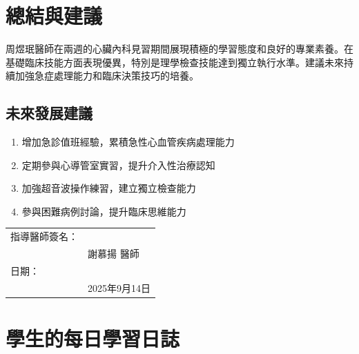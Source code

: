 \documentclass[12pt,a4paper]{article}
\begin{document}
\section{總結與建議}

周煜珉醫師在兩週的心臟內科見習期間展現積極的學習態度和良好的專業素養。在基礎臨床技能方面表現優異，特別是理學檢查技能達到獨立執行水準。建議未來持續加強急症處理能力和臨床決策技巧的培養。

\subsection{未來發展建議}
\begin{enumerate}
\item 增加急診值班經驗，累積急性心血管疾病處理能力
\item 定期參與心導管室實習，提升介入性治療認知
\item 加強超音波操作練習，建立獨立檢查能力
\item 參與困難病例討論，提升臨床思維能力
\end{enumerate}

\vspace{1cm}
\noindent
\begin{tabular}{ll}
指導醫師簽名：& \underline{\hspace{4cm}} \\
& 謝慕揚 醫師 \\[0.5cm]
日期：& \underline{\hspace{4cm}} \\
& 2025年9月14日
\end{tabular}

\section{學生的每日學習日誌}

\end{document}
